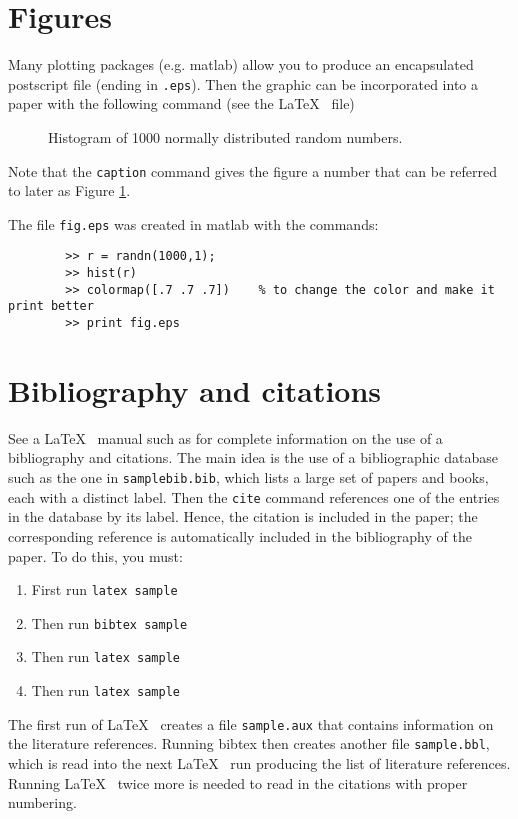 \documentclass{article}
\begin{document}
	\section{Figures}
	Many plotting packages (e.g. matlab) allow you to produce an encapsulated
	postscript file (ending in {\tt .eps}).   Then the graphic can be incorporated
	into a paper with the following command (see the \LaTeX~ file)
	
	\begin{figure}
		\caption{\label{figlabel} Histogram of 1000 normally distributed random
			numbers.}
	\end{figure}
	
	Note that the {\tt caption} command gives the figure a number that can be referred
	to later as Figure \ref{figlabel}.
	
	The file {\tt fig.eps} was created in matlab with the commands:
	\begin{verbatim}
		>> r = randn(1000,1);
		>> hist(r)             
		>> colormap([.7 .7 .7])    % to change the color and make it print better
		>> print fig.eps
	\end{verbatim}
	
	
	\section{Bibliography and citations}
	See a \LaTeX~ manual such as \cite{go-mi-sa:latex}
	for complete information on the use of a bibliography and citations.  The 
	main idea is the use of a bibliographic
	database such as the one in {\tt samplebib.bib}, which lists a large set of papers and
	books, each with a distinct label.  Then the  {\tt cite} command references one of the entries in
	the database by its label.  Hence, the citation is included in the paper; the corresponding reference 
	is automatically included in the bibliography of the paper.  To do this, you must:
	\begin{enumerate}
		\item First run {\tt latex sample}
		\item Then run {\tt bibtex sample}
		\item Then run {\tt latex sample}
		\item Then run {\tt latex sample}
	\end{enumerate}
	The first run of \LaTeX~ creates a file {\tt sample.aux}
	that contains information on the literature references.
	Running bibtex then creates another file {\tt sample.bbl}, which is read into
	the next \LaTeX~ run producing the list of literature references.  
	Running \LaTeX~ twice more is needed to read in the citations with proper numbering. 
	
\end{document}

